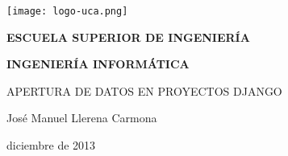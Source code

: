 


\begin{titlepage}

  \begin{center}

    \texttt{[image: logo-uca.png]} \\
    
    \vspace{2.5cm}
    
    \LARGE{\textbf{ESCUELA SUPERIOR DE INGENIERÍA}} \\
    
    \vspace{1.0cm}
    
    \Large{\textbf{INGENIERÍA INFORMÁTICA}} \\
    
    \vspace{3.0cm}
    
    \Large{APERTURA DE DATOS EN PROYECTOS DJANGO} \\
    
    \vspace{2.5cm}
    
    \Large{José Manuel Llerena Carmona} \\
  
    \vspace{0.5cm}

    \large{diciembre de 2013}
    
  \end{center}
\end{titlepage}
